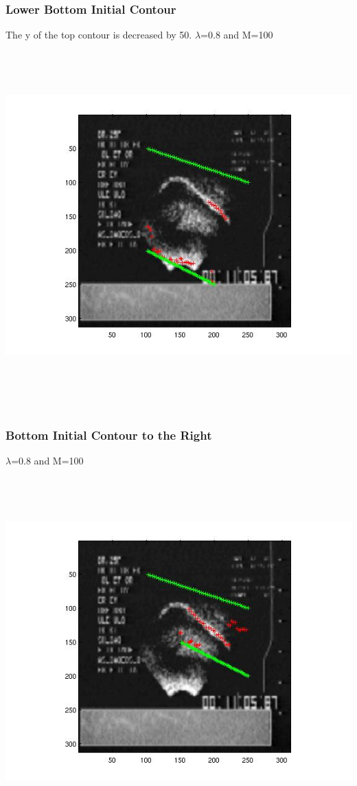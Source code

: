 \documentclass[12pt,a4paper,twocolumn]{article}
\begin{document}
\subsubsection{Lower Bottom Initial Contour}
The y of the top contour is decreased by 50.
$\lambda$=0.8 and M=100
\includegraphics[width=500pt,height=400pt,scale=1]{bot_plus_50.jpg}	
\newpage
\mbox{}
\newpage
\mbox{}
\subsubsection{Bottom Initial Contour to the Right}
$\lambda$=0.8 and M=100
\includegraphics[width=500pt,height=400pt,scale=1]{bot_plus_50x.jpg}	
\newpage
\mbox{}
\newpage
\mbox{}
\end{document}
